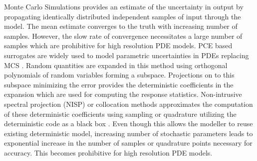 \documentclass{article}
\begin{document}
\textcolor{ss}{Monte Carlo Simulations provides an estimate of the uncertainty in output by propagating identically distributed independent samples of input through the model. The mean estimate converges to the truth with increasing number of samples. However, the slow rate of convergence necessitates a large number of samples which are prohibitive for high resolution PDE models. PCE based surrogates are widely used to model parametric uncertainties in PDEs replacing MCS \cite{PC_challenges,askey_xiu,xiu_review,compare_eldred_NISP,hazra_TDgPC}. Random quantities are expanded in this method using orthogonal polynomials of random variables forming a subspace. Projections on to this subspace minimizing the error provides the deterministic coefficients in the expansion which are used for computing the response statistics. Non-intrusive spectral projection (NISP) or collocation methods approximates the computation of these deterministic coefficients using sampling or quadrature utilizing the deterministic code as a black box
 \cite{compare_eldred_NISP,knio_book,compare_phipps}. Even though this allows the modeller to reuse existing deterministic model, increasing number of stochastic parameters leads to exponential increase in the number of samples or quadrature points necessary for accuracy. This becomes prohibitive for high resolution PDE models.}
\end{document}
